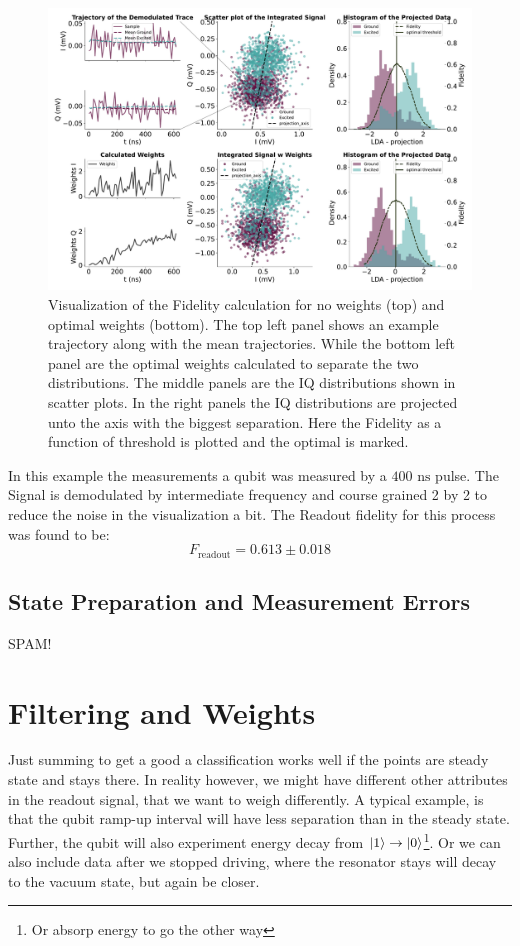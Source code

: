\begin{figure}[t]
    \centering
    \includegraphics{Readout/Figs/Introduction.pdf}
    \caption{Visualization of the Fidelity calculation for no weights (top) and optimal weights (bottom). The top left panel shows an example trajectory along with the mean trajectories. While the bottom left panel are the optimal weights calculated to separate the two distributions. The middle panels are the IQ distributions shown in scatter plots. In the right panels the IQ distributions are projected unto the axis with the biggest separation. Here the Fidelity as a function of threshold is plotted and the optimal is marked.}
    \label{fig:readout_process}
\end{figure}

In this example the measurements a qubit was measured by a $400 \text{ ns}$ pulse. The Signal is demodulated by intermediate frequency and course grained 2 by 2 to reduce the noise in the visualization a bit. The Readout fidelity for this process was found to be:
\begin{equation}
    F_{\text{readout}} = 0.613\pm 0.018
\end{equation}

\subsection{State Preparation and Measurement Errors}
SPAM!

\section{Filtering and Weights}
Just summing to get a good a classification works well if the points are steady state and stays there. In reality however, we might have different other attributes in the readout signal, that we want to weigh differently. A typical example, is that the qubit ramp-up interval will have less separation than in the steady state. Further, the qubit will also experiment energy decay from $\ket{1}\to \ket{0}$\footnote{Or absorp energy to go the other way}. Or we can also include data after we stopped driving, where the resonator stays will decay to the vacuum state, but again be closer.

